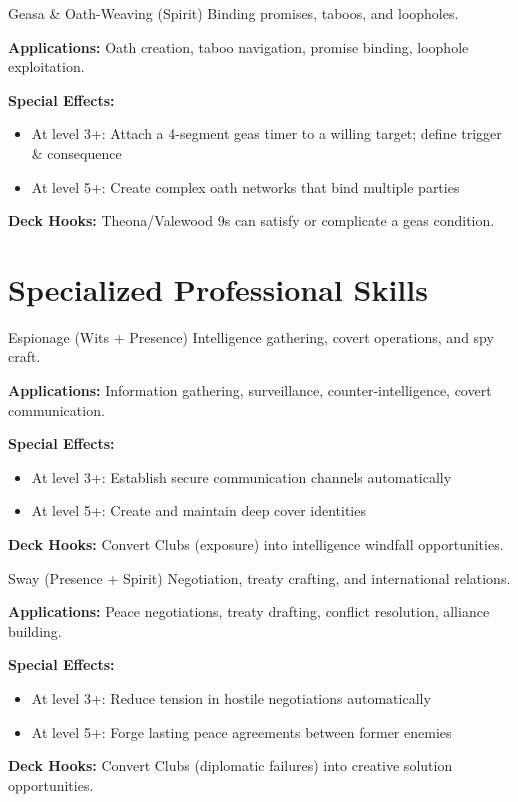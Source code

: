 \documentclass[11pt]{report}
\begin{document}
\begin{skillbox}{Geasa \& Oath-Weaving (Spirit)}
Binding promises, taboos, and loopholes.

\textbf{Applications:} Oath creation, taboo navigation, promise binding, loophole exploitation.

\textbf{Special Effects:}
\begin{itemize}
    \item At level 3+: Attach a 4-segment geas timer to a willing target; define trigger \& consequence
    \item At level 5+: Create complex oath networks that bind multiple parties
\end{itemize}

\textbf{Deck Hooks:} Theona/Valewood 9s can satisfy or complicate a geas condition.
\end{skillbox}

\section{Specialized Professional Skills}

\begin{skillbox}{Espionage (Wits + Presence)}
Intelligence gathering, covert operations, and spy craft.

\textbf{Applications:} Information gathering, surveillance, counter-intelligence, covert communication.

\textbf{Special Effects:}
\begin{itemize}
    \item At level 3+: Establish secure communication channels automatically
    \item At level 5+: Create and maintain deep cover identities
\end{itemize}

\textbf{Deck Hooks:} Convert Clubs (exposure) into intelligence windfall opportunities.
\end{skillbox}

\begin{skillbox}{Sway (Presence + Spirit)}
Negotiation, treaty crafting, and international relations.

\textbf{Applications:} Peace negotiations, treaty drafting, conflict resolution, alliance building.

\textbf{Special Effects:}
\begin{itemize}
    \item At level 3+: Reduce tension in hostile negotiations automatically
    \item At level 5+: Forge lasting peace agreements between former enemies
\end{itemize}

\textbf{Deck Hooks:} Convert Clubs (diplomatic failures) into creative solution opportunities.
\end{skillbox}
\end{document}
